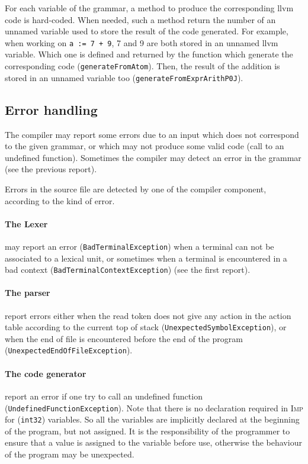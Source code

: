 \documentclass[11pt]{article}
\newcommand\imp{\textsc{Imp}\xspace}
\newcommand\inttt{\texttt{int32}\xspace}
\begin{document}
For each variable of the grammar, a method to produce the corresponding llvm code is hard-coded.
When needed, such a method return the number of an unnamed variable used to store the result of the code generated.
For example, when working on \texttt{a := 7 + 9}, 7 and 9 are both stored in an unnamed llvm variable. Which one is
defined and returned by the function which generate the corresponding code (\texttt{generateFromAtom}).
Then, the result of the addition is stored in an unnamed variable too (\texttt{generateFromExprArithP0J}).

\subsection{Error handling}

The compiler may report some errors due to an input which does not correspond to the given grammar, or which may not
produce some valid code (call to an undefined function).
Sometimes the compiler may detect an error in the grammar (see the previous report).

Errors in the source file are detected by one of the compiler component, according to the kind of error.

\paragraph*{The Lexer} may report an error (\texttt{BadTerminalException}) when a terminal can not be associated to a
lexical unit, or sometimes when a terminal is encountered in a bad context (\texttt{BadTerminalContextException}) (see
the first report).

\paragraph*{The parser} report errors either when the read token does not give any action in the action table
according to the current top of stack (\texttt{UnexpectedSymbolException}),
or when the end of file is encountered before the end of the program (\texttt{UnexpectedEndOfFileException}).

\paragraph*{The code generator} report an error if one try to call an undefined function
(\texttt{UndefinedFunctionException}).
Note that there is no declaration required in \imp for (\inttt) variables.
So all the variables are implicitly declared at the beginning of the program, but not assigned.
It is the responsibility of the programmer to ensure that a value is assigned to the variable before use,
otherwise the behaviour of the program may be unexpected.
\end{document}
